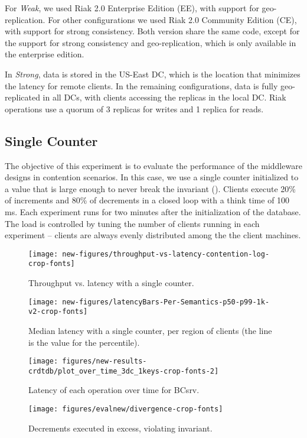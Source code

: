 \documentclass[conference]{IEEEtran}
\begin{document}
For \emph{Weak}, we used Riak 2.0 Enterprise Edition (EE), with support
for geo-replication. 
For other configurations we used Riak 2.0 Community Edition (CE), with support for
strong consistency. 
Both version share the same code, except for the support for strong consistency and
geo-replication, which is only available in the enterprise edition.

In \emph{Strong}, data is stored in the US-East DC, which is the location that
minimizes the latency for remote clients.
In the remaining configurations, data is fully geo-replicated in all DCs, with
clients accessing the replicas in the local DC.
Riak operations use a quorum of 3 replicas for writes and 1 replica for reads.



\subsection{Single Counter}
\label{sec:single_counter}

The objective of this experiment is to evaluate the performance of the middleware 
designs in contention scenarios.
In this case, we use a single counter initialized to a value that is large enough to
never break the invariant (). Clients execute 20\% of increments and 80\% of decrements 
in a closed loop with a think time of 100 ms. Each experiment runs for two minutes 
after the initialization of the database.
The load is controlled by tuning the number of clients running in each 
experiment -- clients are always evenly distributed among the the client machines.
 
\begin{figure}[t]\centering
\texttt{[image: new-figures/throughput-vs-latency-contention-log-crop-fonts]}
\vspace{-1ex}
\caption{Throughput vs. latency with a single counter.}
\label{fig:single:throughput}
\end{figure}




\begin{figure*}[t]
\centering
\begin{minipage}{.29\textwidth}
\texttt{[image: new-figures/latencyBars-Per-Semantics-p50-p99-1k-v2-crop-fonts]}
\caption{Median latency with a single counter, per region of clients (the line is the value for the  percentile).}
\label{fig:single:latencybar}
\end{minipage}\hspace{0.04\textwidth}
\begin{minipage}{.29\textwidth}
\texttt{[image: figures/new-results-crdtdb/plot\_over\_time\_3dc\_1keys-crop-fonts-2]}
\caption{Latency of each operation over time for BCsrv.}
\label{fig:single:latOvertime}
\end{minipage}\hspace{0.04\textwidth}
\begin{minipage}{.29\textwidth}
\texttt{[image: figures/evalnew/divergence-crop-fonts]}
\caption{Decrements executed in excess, violating invariant.}
\label{fig:single:excess}
\end{minipage}\end{figure*}
\end{document}
